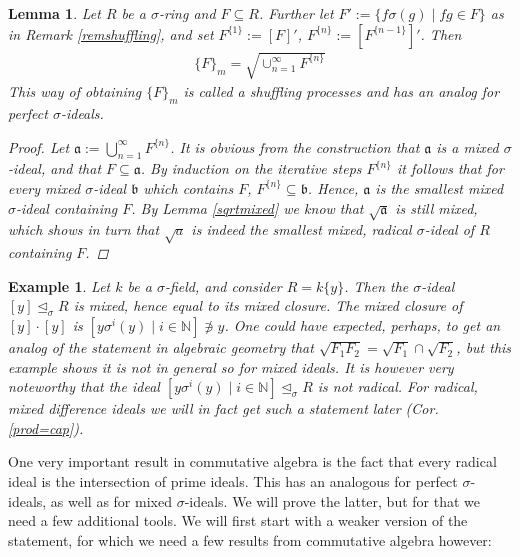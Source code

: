\documentclass{article}
\def\N{\mathbb{N}}
\def\a{\mathfrak{a}}
\def\b{\mathfrak{b}}
\def\s{\sigma}
\def\si{\unlhd_{\sigma}}
\theoremstyle{plain}
\newtheorem{ex}[Satz]{Example}
\newtheorem{lem}[Satz]{Lemma}
\theoremstyle{definition}
\begin{document}
\begin{lem}\label{lemsuffling}
Let $R$ be a $\s$-ring and $F \subseteq R$. Further let $F' := \{f\s(g) \mid fg \in F \}$ as in Remark \ref{remshuffling}, and set $F^{\{1\}}:= [F]'$, $F^{\{n\}}:= [F^{\{n-1\}}]'$. Then
\begin{align} \{F\}_m = \sqrt{\cup_{n=1}^{\infty} F^{\{n\}}} \end{align}
This way of obtaining $\{F\}_m$ is called a shuffling processes and has an analog for perfect $\s$-ideals. 
\begin{proof}
Let $\a:= \bigcup_{n=1}^{\infty} F^{\{n\}}$. It is obvious from the construction that $\a$ is a mixed $\s$-ideal, and that $F \subseteq \a$. 
By induction on the iterative steps $F^{\{n\}}$ it follows that for every mixed $\s$-ideal $\b$ which contains $F$, $F^{\{n\}} \subseteq \b$. Hence, $\a$ is the smallest mixed $\s$-ideal containing $F$.
By Lemma \ref{sqrtmixed} we know that $\sqrt{\a}$ is still mixed, which shows in turn that $\sqrt a$ is indeed the smallest mixed, radical $\s$-ideal of $R$ containing $F$. 
\end{proof}
\end{lem}


\begin{ex} %
Let $k$ be a $\s$-field, and consider $R = k\{y\}$. Then the $\s$-ideal $[y] \si R$ is mixed, hence equal to its mixed closure.
The mixed closure of $[y] \cdot [y]$ is $[ y \s^i(y) \mid i \in \N ] \not \ni y$.
One could have expected, perhaps, to get an analog of the statement in algebraic geometry that $\sqrt{F_1  F_2 } = \sqrt{F_1} \cap \sqrt{F_2}$, but this example shows it is not in general so for mixed ideals.
It is however very noteworthy that the ideal $[ y \s^i(y) \mid i \in \N ] \si R$ is not radical. For radical, mixed difference ideals we will in fact get such a statement later (Cor. \ref{prod=cap}).
\end{ex}

One very important result in commutative algebra is the fact that every radical ideal is the intersection of prime ideals. This has an analogous for perfect $\s$-ideals, as well as for mixed $\s$-ideals. 
We will prove the latter, but for that we need a few additional tools. We will first start with a weaker version of the statement, for which we need a few results from commutative algebra however:
\end{document}
